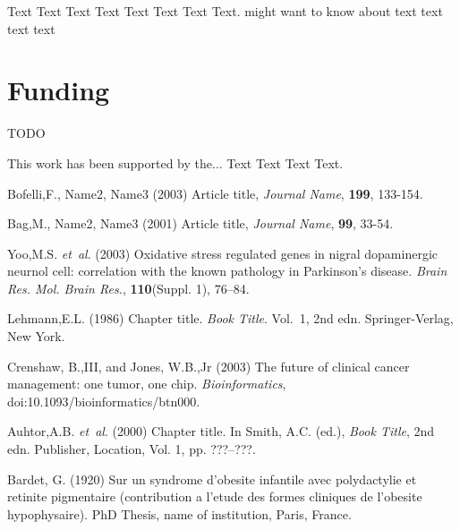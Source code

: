 \documentclass{bioinfo}
\begin{document}
Text Text Text Text Text Text  Text Text.  \citealp{Boffelli03} might want to know about  text
text text text\vspace*{-12pt}

\section*{Funding}
TODO

This work has been supported by the... Text Text  Text Text.\vspace*{-12pt}

%
%
%
%
%
%
%
%
%


\begin{thebibliography}{}

Bofelli,F., Name2, Name3 (2003) Article title, {\it Journal Name}, {\bf 199}, 133-154.

Bag,M., Name2, Name3 (2001) Article title, {\it Journal Name}, {\bf 99}, 33-54.

Yoo,M.S. \textit{et~al}. (2003) Oxidative stress regulated genes
in nigral dopaminergic neurnol cell: correlation with the known
pathology in Parkinson's disease. \textit{Brain Res. Mol. Brain
Res.}, \textbf{110}(Suppl. 1), 76--84.

Lehmann,E.L. (1986) Chapter title. \textit{Book Title}. Vol.~1, 2nd edn. Springer-Verlag, New York.

Crenshaw, B.,III, and Jones, W.B.,Jr (2003) The future of clinical
cancer management: one tumor, one chip. \textit{Bioinformatics},
doi:10.1093/bioinformatics/btn000.

Auhtor,A.B. \textit{et~al}. (2000) Chapter title. In Smith, A.C.
(ed.), \textit{Book Title}, 2nd edn. Publisher, Location, Vol. 1, pp.
???--???.

Bardet, G. (1920) Sur un syndrome d'obesite infantile avec
polydactylie et retinite pigmentaire (contribution a l'etude des
formes cliniques de l'obesite hypophysaire). PhD Thesis, name of
institution, Paris, France.

\end{thebibliography}
\end{document}
